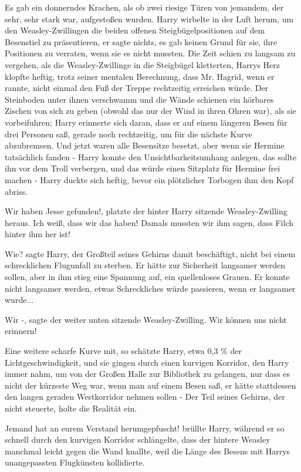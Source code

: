 Es gab ein donnerndes Krachen, als ob zwei riesige Türen von jemandem, der sehr,
sehr stark war, aufgestoßen wurden. Harry wirbelte in der Luft herum, um den
Weasley-Zwillingen die beiden offenen Steigbügelpositionen auf dem Besenstiel zu
präsentieren, er sagte nichts, es gab keinen Grund für sie, ihre Positionen zu
verraten, wenn sie es nicht mussten. Die Zeit schien zu langsam zu vergehen, als
die Weasley-Zwillinge in die Steigbügel kletterten, Harrys Herz klopfte heftig,
trotz seiner mentalen Berechnung, dass Mr. Hagrid, wenn er rannte, nicht einmal
den Fuß der Treppe rechtzeitig erreichen würde. Der Steinboden unter ihnen
verschwamm und die Wände schienen ein hörbares Zischen von sich zu geben (obwohl
das nur der Wind in ihren Ohren war), als sie vorbeifuhren; Harry erinnerte sich
daran, dass er auf einem längeren Besen für drei Personen saß, gerade noch
rechtzeitig, um für die nächste Kurve abzubremsen. Und jetzt waren alle
Besensitze besetzt, aber wenn sie Hermine tatsächlich fanden - Harry konnte den
Unsichtbarkeitsumhang anlegen, das sollte ihn vor dem Troll verbergen, und das
würde einen Sitzplatz für Hermine frei machen - Harry duckte sich heftig, bevor
ein plötzlicher Torbogen ihm den Kopf abriss.

\glqq{}Wir haben Jesse gefunden!\grqq{}, platzte der hinter Harry sitzende
Weasley-Zwilling heraus. \glqq{}Ich weiß, dass wir das haben! Damals mussten wir
ihm sagen, dass Filch hinter ihm her ist!\grqq{}

\glqq{}Wie?\grqq{} sagte Harry, der Großteil seines Gehirns damit beschäftigt,
nicht bei einem schrecklichen Flugunfall zu sterben. Er hätte zur Sicherheit
langsamer werden sollen, aber in ihm stieg eine Spannung auf, ein quellenloses
Grauen. Er konnte nicht langsamer werden, etwas Schreckliches würde passieren,
wenn er langsamer wurde...

\glqq{}Wir -\grqq{}, sagte der weiter unten sitzende Weasley-Zwilling. \glqq{}Wir
können uns nicht erinnern!\grqq{}

Eine weitere scharfe Kurve mit, so schätzte Harry, etwa 0,3 \% der
Lichtgeschwindigkeit, und sie gingen durch einen kurvigen Korridor, den Harry
immer nahm, um von der Großen Halle zur Bibliothek zu gelangen, nur dass es
nicht der kürzeste Weg war, wenn man auf einem Besen saß, er hätte stattdessen
den langen geraden Westkorridor nehmen sollen - Der Teil seines Gehirns, der
nicht steuerte, holte die Realität ein.

\glqq{}Jemand hat an eurem Verstand herumgepfuscht!\grqq{} brüllte Harry, während
er so schnell durch den kurvigen Korridor schlängelte, dass der hintere Weasley
manchmal leicht gegen die Wand knallte, weil die Länge des Besens mit Harrys
unangepassten Flugkünsten kollidierte.

